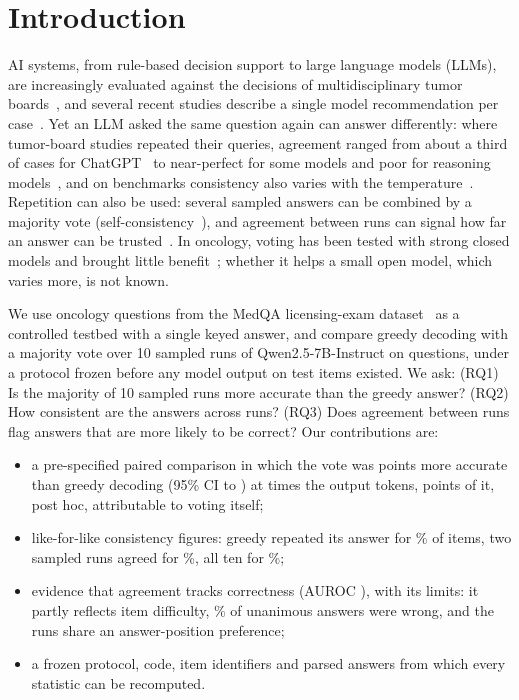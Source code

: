 \section{Introduction}\label{sec:intro}
AI systems, from rule-based decision support to large language models (LLMs), are increasingly evaluated against the
decisions of multidisciplinary tumor boards~\cite{sharma2026review,zhao2020watson,liao2025,li2025imitation,asoglu2026},
and several recent studies describe a single model recommendation per case~\cite{popescu2026,zhou2026lung,dindelegan2026}.
Yet an LLM asked the same question again can answer differently: where tumor-board studies repeated their queries,
agreement ranged from about a third of cases for ChatGPT~\cite{liao2025,asoglu2026} to near-perfect for some models and
poor for reasoning models~\cite{li2025imitation}, and on benchmarks consistency also varies with the
temperature~\cite{pinhanez2025,liu2026repro}. Repetition can also be used: several sampled answers can be combined by
a majority vote (self-consistency~\cite{wang2022selfconsistency}), and agreement between runs can signal how far an
answer can be trusted~\cite{rydzewski2024}. In oncology, voting has been tested with strong closed models and brought
little benefit~\cite{holmes2023,stifini2026,windisch2026}; whether it helps a small open model, which varies more,
is not known.

We use oncology questions from the MedQA licensing-exam dataset~\cite{jin2021medqa} as a controlled testbed with a
single keyed answer, and compare greedy decoding with a majority vote over 10 sampled runs of Qwen2.5-7B-Instruct on
\nTest{} questions, under a protocol frozen before any model output on test items existed. We ask: (RQ1) Is the
majority of 10 sampled runs more accurate than the greedy answer? (RQ2) How consistent are the answers across runs?
(RQ3) Does agreement between runs flag answers that are more likely to be correct? Our contributions are:
\begin{itemize}
\item a pre-specified paired comparison in which the vote was \diffMain{} points more accurate than greedy decoding
  (95\% CI \diffMainLo{} to \diffMainHi) at \tokRatio{} times the output tokens, \decompVote{} points of it, post hoc,
  attributable to voting itself;
\item like-for-like consistency figures: greedy repeated its answer for \rerunSamePct\% of items, two sampled runs
  agreed for \pairAgree\%, all ten for \unanimity\%;
\item evidence that agreement tracks correctness (AUROC \auroc), with its limits: it partly reflects item difficulty,
  \unanimousWrongPct\% of unanimous answers were wrong, and the runs share an answer-position preference;
\item a frozen protocol, code, item identifiers and parsed answers from which every statistic can be recomputed.
\end{itemize}
